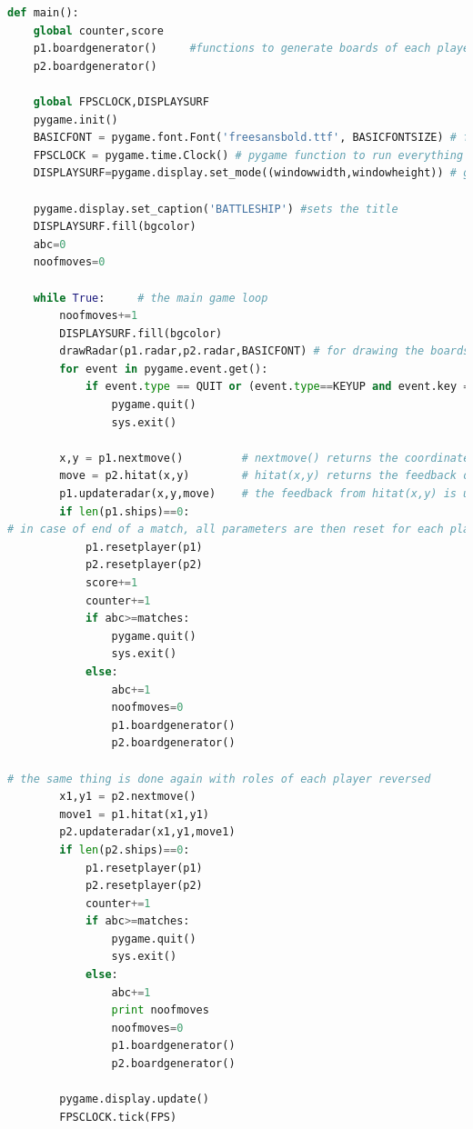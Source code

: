 \documentclass{article}
\begin{document}
\begin{lstlisting}[language=Python,frame=single,tabsize=2,breaklines=true]
def main():
	global counter,score
	p1.boardgenerator()		#functions to generate boards of each player
	p2.boardgenerator()

	global FPSCLOCK,DISPLAYSURF
	pygame.init()
	BASICFONT = pygame.font.Font('freesansbold.ttf', BASICFONTSIZE) # for writing score
	FPSCLOCK = pygame.time.Clock() # pygame function to run everything at a given FPS
	DISPLAYSURF=pygame.display.set_mode((windowwidth,windowheight)) # generating the window
	
	pygame.display.set_caption('BATTLESHIP') #sets the title
	DISPLAYSURF.fill(bgcolor) 
	abc=0
	noofmoves=0

	while True:		# the main game loop
		noofmoves+=1
		DISPLAYSURF.fill(bgcolor)
		drawRadar(p1.radar,p2.radar,BASICFONT) # for drawing the boards of both players and diplaying the score at a given moment 
		for event in pygame.event.get():
			if event.type == QUIT or (event.type==KEYUP and event.key == K_ESCAPE):
				pygame.quit()
				sys.exit()

		x,y = p1.nextmove()			# nextmove() returns the coordinates(x,y) to shoot at next
		move = p2.hitat(x,y)		# hitat(x,y) returns the feedback on shooting at x,y
		p1.updateradar(x,y,move)	# the feedback from hitat(x,y) is used to update the radar of the player who took the shot
		if len(p1.ships)==0:
# in case of end of a match, all parameters are then reset for each player
			p1.resetplayer(p1)		
			p2.resetplayer(p2)
			score+=1
			counter+=1
			if abc>=matches:
				pygame.quit()
				sys.exit()
			else:
				abc+=1
				noofmoves=0
				p1.boardgenerator()
				p2.boardgenerator()

# the same thing is done again with roles of each player reversed
		x1,y1 = p2.nextmove()
		move1 = p1.hitat(x1,y1)
		p2.updateradar(x1,y1,move1)
		if len(p2.ships)==0:
			p1.resetplayer(p1)
			p2.resetplayer(p2)
			counter+=1
			if abc>=matches:
				pygame.quit()
				sys.exit()
			else:
				abc+=1
				print noofmoves
				noofmoves=0
				p1.boardgenerator()
				p2.boardgenerator()
		
		pygame.display.update()
		FPSCLOCK.tick(FPS)		

\end{lstlisting}
\end{document}
